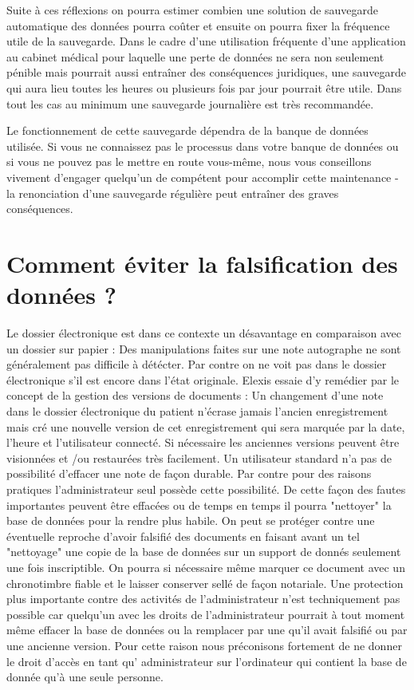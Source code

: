 Suite à ces réflexions on pourra estimer combien une solution de sauvegarde automatique des données pourra coûter et ensuite on pourra fixer la fréquence utile de la sauvegarde.
Dans le cadre d'une utilisation fréquente d'une application au cabinet médical pour laquelle une perte de données ne sera non seulement pénible mais pourrait aussi entraîner des conséquences juridiques, une sauvegarde qui aura lieu toutes les heures ou plusieurs fois par jour pourrait être utile. Dans tout les cas au minimum une sauvegarde journalière est très recommandée.

Le fonctionnement de cette sauvegarde dépendra de la banque de données utilisée. Si vous ne connaissez pas le processus dans votre banque de données ou si vous ne pouvez pas le mettre en route vous-même, nous vous conseillons vivement d'engager quelqu'un de compétent pour accomplir cette maintenance - la renonciation d'une sauvegarde régulière peut entraîner des graves conséquences.

\section{Comment éviter la falsification des données ? }

Le dossier électronique est dans ce contexte un désavantage en comparaison avec un dossier sur papier : Des manipulations faites sur une note autographe ne sont généralement pas difficile à détécter. Par contre on ne voit pas dans le dossier électronique s'il est encore dans l'état originale. Elexis essaie d'y remédier par le concept de la gestion des versions de documents :
Un changement d'une note dans le dossier électronique du patient n'écrase jamais l'ancien enregistrement mais cré une nouvelle version de cet enregistrement qui sera marquée par la date, l'heure et l'utilisateur connecté. Si nécessaire les anciennes versions peuvent être visionnées et /ou restaurées très facilement. Un utilisateur standard n'a pas de possibilité d'effacer une note de façon durable. Par contre pour des raisons pratiques l'administrateur seul possède cette possibilité. De cette façon des fautes importantes peuvent être effacées ou de temps en temps il pourra "nettoyer" la base de données pour la rendre plus habile. On peut se protéger contre une éventuelle reproche d'avoir falsifié des documents en faisant avant un tel "nettoyage" une copie de la base de données sur un support de donnés seulement une fois inscriptible. On pourra si nécessaire même marquer ce document avec un chronotimbre fiable et le laisser conserver sellé de façon notariale. Une protection plus importante contre des activités de l'administrateur n'est techniquement pas possible car quelqu'un avec les droits de l'administrateur pourrait à tout moment même effacer la base de données ou la remplacer par une qu'il avait falsifié ou par une ancienne version. Pour cette raison nous préconisons fortement de ne donner le droit d'accès en tant qu' administrateur sur l'ordinateur qui contient la base de donnée qu'à une seule personne.


